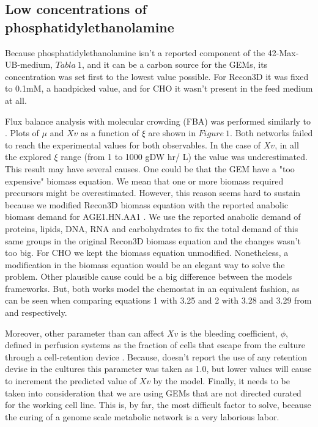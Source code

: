 \subsection{Low concentrations of phosphatidylethanolamine} 
	
	Because phosphatidylethanolamine isn't a reported component of the 42-Max-UB-medium, $Tabla\ 1$, and it can be a carbon source for the GEMs, its concentration was set first to the lowest value possible. For Recon3D it was fixed to 0.1mM, a handpicked value, and for CHO it wasn't present in the feed medium at all.
	
	Flux balance analysis with molecular crowding (FBA) was performed similarly to \cite{Fernandez-de-Cossio-Diaz2018b}. Plots of $\mu$ and $Xv$ as a function of $\xi$ are shown in $Figure\ 1$. Both networks failed to reach the experimental values for both observables. In the case of $Xv$, in all the explored $\xi$ range (from 1 to 1000 gDW hr/ L) the value was underestimated. This result may have several causes. One could be that the GEM have a "too expensive" biomass equation. We mean that one or more biomass required precursors might be overestimated. However, this reason seems hard to sustain because we modified Recon3D biomass equation with the reported anabolic biomass demand for AGE1.HN.AA1 \cite{Niklas2013}. We use the reported anabolic demand of proteins, lipids, DNA, RNA and carbohydrates to fix the total demand of this same groups in the original Recon3D biomass equation and the changes wasn't too big. For CHO we kept the biomass equation unmodified. Nonetheless, a modification in the biomass equation would be an elegant way to solve the problem. Other plausible cause could be a big difference between the models frameworks. But, both works model the chemostat in an equivalent fashion, as can be seen when comparing equations 1 with 3.25 and 2 with 3.28 and 3.29 from \cite{Fernandez-de-Cossio-Diaz2017} and \cite{Rath2017a} respectively.
	 
	Moreover, other parameter than can affect $Xv$ is the bleeding coefficient, $\phi$,
	defined in perfusion systems as the fraction of cells that escape from the culture through a cell-retention device \cite{Fernandez-de-Cossio-Diaz2017}. Because, \cite{Rath2017a} doesn't report the use of any retention devise in the cultures this parameter was taken as 1.0, but lower values will cause to increment the predicted value of  $Xv$ by the model. Finally, it needs to be taken into consideration that we are using GEMs that are not directed curated for the working cell line. This is, by far, the most difficult factor to solve, because the curing of a genome scale metabolic network is a very laborious labor.


